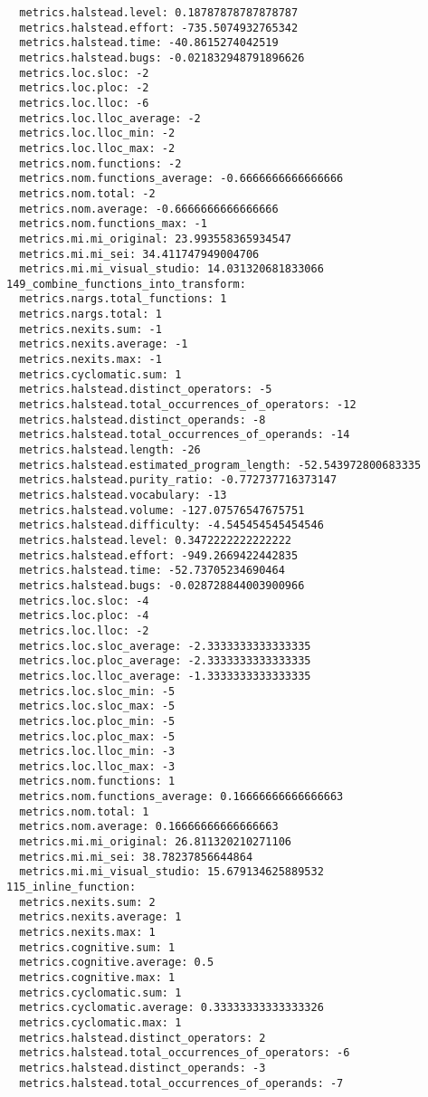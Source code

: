 \begin{verbatim}
  metrics.halstead.level: 0.18787878787878787
  metrics.halstead.effort: -735.5074932765342
  metrics.halstead.time: -40.8615274042519
  metrics.halstead.bugs: -0.021832948791896626
  metrics.loc.sloc: -2
  metrics.loc.ploc: -2
  metrics.loc.lloc: -6
  metrics.loc.lloc_average: -2
  metrics.loc.lloc_min: -2
  metrics.loc.lloc_max: -2
  metrics.nom.functions: -2
  metrics.nom.functions_average: -0.6666666666666666
  metrics.nom.total: -2
  metrics.nom.average: -0.6666666666666666
  metrics.nom.functions_max: -1
  metrics.mi.mi_original: 23.993558365934547
  metrics.mi.mi_sei: 34.411747949004706
  metrics.mi.mi_visual_studio: 14.031320681833066
149_combine_functions_into_transform:
  metrics.nargs.total_functions: 1
  metrics.nargs.total: 1
  metrics.nexits.sum: -1
  metrics.nexits.average: -1
  metrics.nexits.max: -1
  metrics.cyclomatic.sum: 1
  metrics.halstead.distinct_operators: -5
  metrics.halstead.total_occurrences_of_operators: -12
  metrics.halstead.distinct_operands: -8
  metrics.halstead.total_occurrences_of_operands: -14
  metrics.halstead.length: -26
  metrics.halstead.estimated_program_length: -52.543972800683335
  metrics.halstead.purity_ratio: -0.772737716373147
  metrics.halstead.vocabulary: -13
  metrics.halstead.volume: -127.07576547675751
  metrics.halstead.difficulty: -4.545454545454546
  metrics.halstead.level: 0.3472222222222222
  metrics.halstead.effort: -949.2669422442835
  metrics.halstead.time: -52.73705234690464
  metrics.halstead.bugs: -0.028728844003900966
  metrics.loc.sloc: -4
  metrics.loc.ploc: -4
  metrics.loc.lloc: -2
  metrics.loc.sloc_average: -2.3333333333333335
  metrics.loc.ploc_average: -2.3333333333333335
  metrics.loc.lloc_average: -1.3333333333333335
  metrics.loc.sloc_min: -5
  metrics.loc.sloc_max: -5
  metrics.loc.ploc_min: -5
  metrics.loc.ploc_max: -5
  metrics.loc.lloc_min: -3
  metrics.loc.lloc_max: -3
  metrics.nom.functions: 1
  metrics.nom.functions_average: 0.16666666666666663
  metrics.nom.total: 1
  metrics.nom.average: 0.16666666666666663
  metrics.mi.mi_original: 26.811320210271106
  metrics.mi.mi_sei: 38.78237856644864
  metrics.mi.mi_visual_studio: 15.679134625889532
115_inline_function:
  metrics.nexits.sum: 2
  metrics.nexits.average: 1
  metrics.nexits.max: 1
  metrics.cognitive.sum: 1
  metrics.cognitive.average: 0.5
  metrics.cognitive.max: 1
  metrics.cyclomatic.sum: 1
  metrics.cyclomatic.average: 0.33333333333333326
  metrics.cyclomatic.max: 1
  metrics.halstead.distinct_operators: 2
  metrics.halstead.total_occurrences_of_operators: -6
  metrics.halstead.distinct_operands: -3
  metrics.halstead.total_occurrences_of_operands: -7

\end{verbatim}
